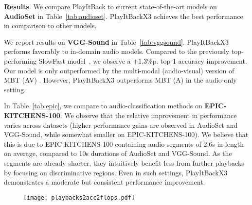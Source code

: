 \documentclass{article}
\begin{document}
\noindent
\textbf{Results}. We compare PlayItBack to current state-of-the-art models on \textbf{AudioSet} in Table~\ref{tab:audioset}. PlayItBackX3 achieves the best performance in comparison to other models. 

We report results on \textbf{VGG-Sound} in Table~\ref{tab:vggsound}. PlayItBackX3 performs favorably to in-domain audio models. Compared to the previously top-performing SlowFast model~\cite{kazakos2021slow}, we observe a +1.3\%p. top-1 accuracy improvement. Our model is only outperformed by the multi-modal (audio-visual) version of MBT (AV) \cite{nagrani2021attention}. However, PlayItBackX3 outperforms MBT (A) in the audio-only setting.

In Table~\ref{tab:epic}, we compare to audio-classification methods on \textbf{EPIC-KITCHENS-100}. We observe that the relative improvement in performance varies across datasets (higher performance gains are observed in AudioSet and VGG-Sound, while somewhat smaller on EPIC-KITCHENS-100). We believe that this is due to EPIC-KITCHENS-100 containing audio segments of 2.6s in length on average, compared to 10s durations of AudioSet and VGG-Sound.
As the segments are already shorter, they intuitively benefit less from further playbacks by focusing on discriminative regions. Even in such settings, PlayItBackX3 demonstrates a moderate but consistent performance improvement.  
 


\begin{figure}[t]
\vspace{-.8em}
\begin{minipage}[b]{0.4\linewidth}
    \centering
    \vspace{1.4em}
    \label{tab:slot_attn_iter}
\end{minipage}
\hfill
\begin{minipage}[b]{0.55\linewidth}
    \centering
    \texttt{[image: playbacks2acc2flops.pdf]}
    \label{fig:acc2flops}
\end{minipage}
\vspace{-1em}
\end{figure}
\end{document}
